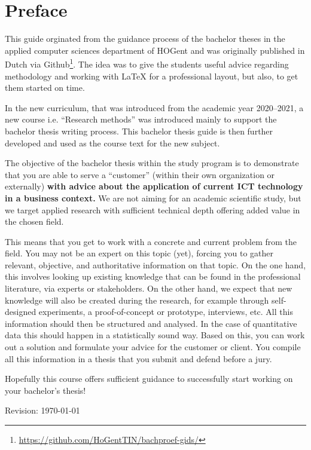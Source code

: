 \chapter*{Preface}
\label{ch:preface}

This guide orginated from the guidance process of the bachelor theses in the applied computer sciences department of HOGent and was originally published in Dutch via  Github\footnote{\url{https://github.com/HoGentTIN/bachproef-gids/}}. The idea was to give the students useful advice regarding methodology and working with {\LaTeX} for a professional layout, but also, to get them started on time.

In the new curriculum, that was introduced from the academic year 2020--2021, a new course i.e. ``Research methods'' was introduced mainly to support the bachelor thesis writing process. This bachelor thesis guide is then further developed and used as the course text for the new subject.

The objective of the bachelor thesis within the study program is to demonstrate that you are able to serve a ``customer'' (within their own organization or externally) \textbf{with advice about the application of current ICT technology in a business context. } We are not aiming for an academic scientific study, but we target applied research with sufficient technical depth offering added value in the chosen field.

This means that you get to work with a concrete and current problem from the field. You may not be an expert on this topic (yet), forcing you to gather relevant, objective, and authoritative information on that topic. On the one hand, this involves looking up existing knowledge that can be found in the professional literature, via experts or stakeholders. On the other hand, we expect that new knowledge will also be created during the research, for example through self-designed experiments, a proof-of-concept or prototype, interviews, etc. All this information should then be structured and analysed. In the case of quantitative data this should happen in a statistically sound way. Based on this, you can work out a solution and formulate your advice for the customer or client. You compile all this information in a thesis that you submit and defend before a jury.

Hopefully this course offers sufficient guidance to successfully start working on your bachelor's thesis!

\bigskip
Revision: \today